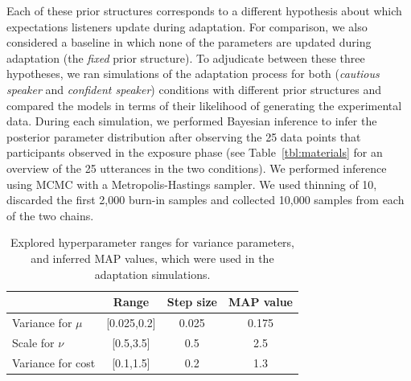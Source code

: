 \documentclass[man, floatsintext]{apa6}
\begin{document}
Each of these prior structures corresponds to a different hypothesis about which expectations listeners update during adaptation. For comparison, we also considered a baseline in which none of the parameters are updated during adaptation (the {\it fixed} prior structure). To adjudicate between these three hypotheses, we ran simulations of the adaptation process for both (\textit{cautious speaker} and \textit{confident speaker}) conditions with different prior structures and compared the models in terms of their likelihood of generating the experimental data. During each simulation, we performed Bayesian inference to infer the posterior parameter distribution after observing the 25 data points that participants observed in the exposure phase (see Table~\ref{tbl:materials} for an overview of the 25 utterances in the two conditions). We performed inference using MCMC with a Metropolis-Hastings sampler. We used thinning of 10, discarded the first 2,000 burn-in samples and collected 10,000 samples from each of the two chains.

\begin{table}
\center
\begin{tabular}{l | c | c | c  }
 & Range &  Step size & MAP value  \\ \midrule
Variance for $\mu$ & [0.025,0.2] & 0.025 & 0.175  \\
Scale for $\nu$  & [0.5,3.5]  & 0.5   & 2.5  \\
Variance for cost & [0.1,1.5] & 0.2 & 1.3  \\
\end{tabular}
\caption{Explored hyperparameter ranges for variance parameters, and inferred MAP values, which were used in the adaptation simulations.  \label{tbl:hyperparams}}
\end{table}
\end{document}
